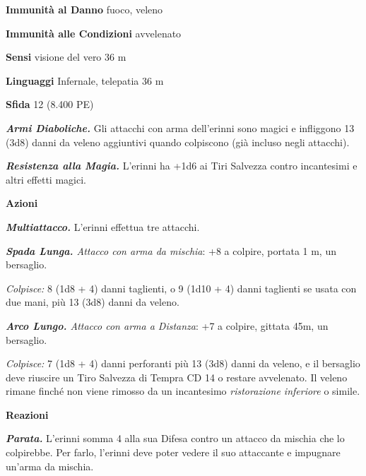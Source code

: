 \begin{multicols}{2}
\textbf{Immunità al Danno} fuoco, veleno

\textbf{Immunità alle Condizioni} avvelenato

\textbf{Sensi} visione del vero 36 m

\textbf{Linguaggi} Infernale, telepatia 36 m

\textbf{Sfida} 12 (8.400 PE)

\emph{\textbf{Armi Diaboliche.}} Gli attacchi con arma dell'erinni sono magici e infliggono 13 (3d8) danni da veleno aggiuntivi quando colpiscono (già incluso negli attacchi).

\emph{\textbf{Resistenza alla Magia.}} L'erinni ha +1d6 ai Tiri Salvezza contro incantesimi e altri effetti magici.

\textbf{Azioni}

\emph{\textbf{Multiattacco.}} L'erinni effettua tre attacchi.

\emph{\textbf{Spada Lunga.} Attacco con arma da mischia}: +8 a colpire, portata 1 m, un bersaglio.

\emph{Colpisce:} 8 (1d8 + 4) danni taglienti, o 9 (1d10 + 4) danni taglienti se usata con due mani, più 13 (3d8) danni da veleno.

\emph{\textbf{Arco Lungo.} Attacco con arma a Distanza}: +7 a colpire, gittata 45m, un bersaglio.

\emph{Colpisce:} 7 (1d8 + 4) danni perforanti più 13 (3d8) danni da veleno, e il bersaglio deve riuscire un Tiro Salvezza di Tempra CD 14 o restare avvelenato. Il veleno rimane finché non viene rimosso da un incantesimo \emph{ristorazione inferiore} o simile.

\textbf{Reazioni}

\emph{\textbf{Parata.}} L'erinni somma 4 alla sua Difesa contro un attacco da mischia che lo colpirebbe. Per farlo, l'erinni deve poter vedere il suo attaccante e impugnare un'arma da mischia.


\end{multicols}
